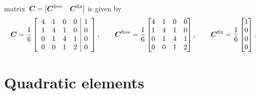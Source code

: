 \begin{example}
matrix~$\boldsymbol{C}=[\boldsymbol{C}^{\mathrm{free}}\quad\boldsymbol{C}^{\mathrm{fix}}]$ is given by
\[
\boldsymbol{C}=\frac{1}{6}\left[\begin{array}{cccc|c}
4&1&0&0&1\\ 1&4&1&0&0\\ 0&1&4&1&0\\ 0&0&1&2&0\end{array}\right],\qquad
\boldsymbol{C}^{\mathrm{free}}=\frac{1}{6}\begin{bmatrix}
4&1&0&0\\ 1&4&1&0\\ 0&1&4&1\\ 0&0&1&2\end{bmatrix},\qquad
\boldsymbol{C}^{\mathrm{fix}}=\frac{1}{6}\begin{bmatrix}1\\ 0\\ 0\\ 0\end{bmatrix}.
\]
\end{example}

\section{Quadratic elements}\label{sec: quadratic elements}

